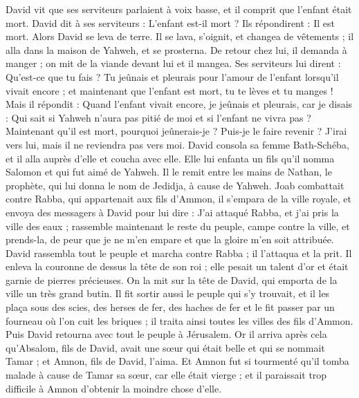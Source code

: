 \begin{multicols}{2}
David vit que ses serviteurs parlaient à voix basse, et il comprit que l'enfant était mort. David dit à ses serviteurs : L'enfant est-il mort ? Ils répondirent : Il est mort.
Alors David se leva de terre. Il se lava, s'oignit, et changea de vêtements ; il alla dans la maison de Yahweh, et se prosterna. De retour chez lui, il demanda à manger ; on mit de la viande devant lui et il mangea.
Ses serviteurs lui dirent : Qu'est-ce que tu fais ? Tu jeûnais et pleurais pour l'amour de l'enfant lorsqu'il vivait encore ; et maintenant que l'enfant est mort, tu te lèves et tu manges !
Mais il répondit : Quand l'enfant vivait encore, je jeûnais et pleurais, car je disais : Qui sait si Yahweh n'aura pas pitié de moi et si l'enfant ne vivra pas ?
Maintenant qu'il est mort, pourquoi jeûnerais-je ? Puis-je le faire revenir ? J'irai vers lui, mais il ne reviendra pas vers moi.
David consola sa femme Bath-Schéba, et il alla auprès d'elle et coucha avec elle. Elle lui enfanta un fils qu'il nomma Salomon et qui fut aimé de Yahweh.
Il le remit entre les mains de Nathan, le prophète, qui lui donna le nom de Jedidja, à cause de Yahweh.
Joab combattait contre Rabba, qui appartenait aux fils d'Ammon, il s'empara de la ville royale,
et envoya des messagers à David pour lui dire : J'ai attaqué Rabba, et j'ai pris la ville des eaux ;
rassemble maintenant le reste du peuple, campe contre la ville, et prends-la, de peur que je ne m'en empare et que la gloire m'en soit attribuée.
David rassembla tout le peuple et marcha contre Rabba ; il l'attaqua et la prit.
Il enleva la couronne de dessus la tête de son roi ; elle pesait un talent d'or et était garnie de pierres précieuses. On la mit sur la tête de David, qui emporta de la ville un très grand butin.
Il fit sortir aussi le peuple qui s'y trouvait, et il les plaça sous des scies, des herses de fer, des haches de fer et le fit passer par un fourneau où l'on cuit les briques ; il traita ainsi toutes les villes des fils d'Ammon. Puis David retourna avec tout le peuple à Jérusalem.
\VerseOne{}Or il arriva après cela qu'Absalom, fils de David, avait une sœur qui était belle et qui se nommait Tamar ; et Amnon, fils de David, l'aima.
Et Amnon fut si tourmenté qu'il tomba malade à cause de Tamar sa sœur, car elle était vierge ; et il paraissait trop difficile à Amnon d'obtenir la moindre chose d'elle.

\end{multicols}
